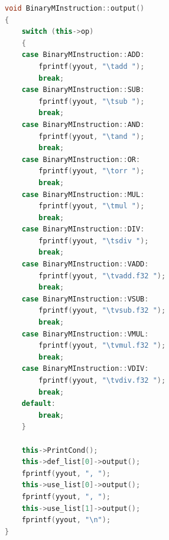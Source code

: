 \documentclass[UTF8,a4paper,10pt]{ctexart}
\begin{document}
\begin{lstlisting}[title = 机器码翻译, language = c++]
void BinaryMInstruction::output()
{
    switch (this->op)
    {
    case BinaryMInstruction::ADD:
        fprintf(yyout, "\tadd ");
        break;
    case BinaryMInstruction::SUB:
        fprintf(yyout, "\tsub ");
        break;
    case BinaryMInstruction::AND:
        fprintf(yyout, "\tand ");
        break;
    case BinaryMInstruction::OR:
        fprintf(yyout, "\torr ");
        break;
    case BinaryMInstruction::MUL:
        fprintf(yyout, "\tmul ");
        break;
    case BinaryMInstruction::DIV:
        fprintf(yyout, "\tsdiv ");
        break;
    case BinaryMInstruction::VADD:
        fprintf(yyout, "\tvadd.f32 ");
        break;
    case BinaryMInstruction::VSUB:
        fprintf(yyout, "\tvsub.f32 ");
        break;
    case BinaryMInstruction::VMUL:
        fprintf(yyout, "\tvmul.f32 ");
        break;
    case BinaryMInstruction::VDIV:
        fprintf(yyout, "\tvdiv.f32 ");
        break;
    default:
        break;
    }

    this->PrintCond();
    this->def_list[0]->output();
    fprintf(yyout, ", ");
    this->use_list[0]->output();
    fprintf(yyout, ", ");
    this->use_list[1]->output();
    fprintf(yyout, "\n");
}
\end{lstlisting}
\end{document}

